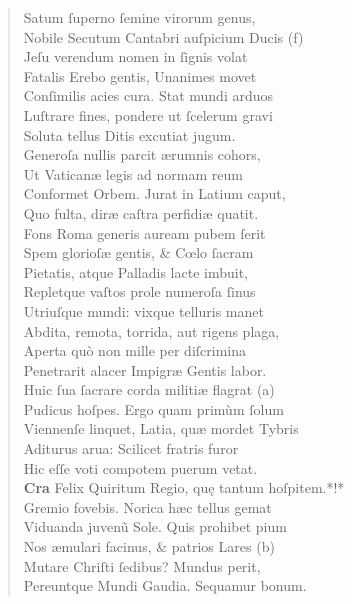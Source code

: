 \documentclass[a4paper,12pt]{article}
\begin{document}
\begin{verse}
Satum ſuperno ſemine virorum genus,\\[0pt]
Nobile Secutum Cantabri auſpicium Ducis (f)\footnotemark\\[0pt]
Jeſu verendum nomen in ſignis volat\\[0pt]
Fatalis Erebo gentis, Unanimes movet\\[0pt]
Conſimilis acies cura. Stat mundi arduos\\[0pt]
Luſtrare fines, pondere ut ſcelerum gravi\\[0pt]
Soluta tellus Ditis excutiat jugum.\\[0pt]
Generoſa nullis parcit ærumnis cohors,\\[0pt]
Ut Vaticanæ legis ad normam reum\\[0pt]
Conformet Orbem. Jurat in Latium caput,\\[0pt]
Quo fulta, diræ caſtra perfidiæ quatit.\\[0pt]
Fons Roma generis auream pubem ſerit\\[0pt]
Spem glorioſæ gentis, \& Cœlo ſacram\\[0pt]
Pietatis, atque Palladis lacte imbuit,\\[0pt]
Repletque vaſtos prole numeroſa ſinus\\[0pt]
Utriuſque mundi: vixque telluris manet\\[0pt]
Abdita, remota, torrida, aut rigens plaga,\\[0pt]
Aperta quò non mille per diſcrimina\\[0pt]
Penetrarit alacer Impigræ Gentis labor.\\[0pt]
Huic ſua ſacrare corda militiæ flagrat (a)\footnotemark\\[0pt]
Pudicus hoſpes. Ergo quam primùm ſolum\\[0pt]
Viennenſe linquet, Latia, quæ mordet Tybris\\[0pt]
Aditurus arua: Scilicet fratris furor\\[0pt]
Hic eſſe voti compotem puerum vetat.\\[0pt]
\textbf{Cra} Felix Quiritum Regio, quę tantum hoſpitem.*!*\\[0pt]
Gremio fovebis. Norica hæc tellus gemat\\[0pt]
Viduanda juvenũ Sole. Quis prohibet pium\\[0pt]
Nos æmulari facinus, \& patrios Lares (b)\footnotemark\\[0pt]
Mutare Chriſti ſedibus? Mundus perit,\\[0pt]
Pereuntque Mundi Gaudia. Sequamur bonum.\\[0pt]

\end{verse}
\end{document}
